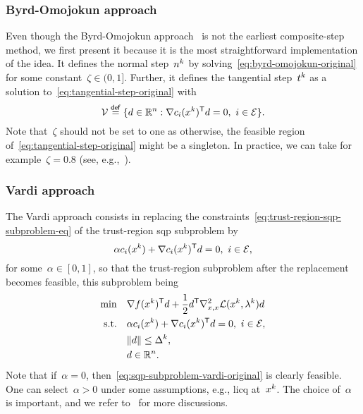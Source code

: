 \subsubsection{Byrd-Omojokun approach}

Even though the Byrd-Omojokun approach~\cite{Byrd_1987,Omojokun_1989} is not the earliest composite-step method, we first present it because it is the most straightforward implementation of the idea.
It defines the normal step~$\nstep[k]$ by solving~\cref{eq:byrd-omojokun-original} for some constant~$\zeta \in (0, 1]$.
Further, it defines the tangential step~$\tstep[k]$ as a solution to~\cref{eq:tangential-step-original} with
\begin{equation}
    \label{eq:tangential-subproblem-feasible-set}
    \mathcal{V} \eqdef \set{\step \in \R^n : \nabla \con{i}(\iter[k])^{\T} \step = 0, ~ i \in \ieq}.
\end{equation}
Note that~$\zeta$ should not be set to one as otherwise, the feasible region of~\cref{eq:tangential-step-original} might be a singleton.
In practice, we can take for example~$\zeta = 0.8$ (see, e.g.,~\cite[Eq.~(18.45)]{Nocedal_Wright_2006}).

\subsubsection{Vardi approach}

The Vardi approach consists in replacing the constraints~\cref{eq:trust-region-sqp-subproblem-eq} of the trust-region \gls{sqp} subproblem by
\begin{equation}
    \label{eq:vardi-original}
    \alpha \con{i}(\iter[k]) + \nabla \con{i}(\iter[k])^{\T} \step = 0, ~ i \in \ieq,
\end{equation}
for some~$\alpha \in [0, 1]$, so that the trust-region subproblem after the replacement becomes feasible, this subproblem being
\begin{subequations}
    \label{eq:sqp-subproblem-vardi-original}
    \begin{align}
        \min        & \quad \nabla \obj(\iter[k])^{\T} \step + \frac{1}{2} \step^{\T} \nabla_{x, x}^2 \lag(\iter[k], \lm[k]) \step\\
        \text{s.t.} & \quad \alpha \con{i}(\iter[k]) + \nabla \con{i}(\iter[k])^{\T} \step = 0, ~ i \in \ieq,\\
                    & \quad \norm{\step} \le \rad[k],\\
                    & \quad \step \in \R^n. \nonumber
    \end{align}
\end{subequations}
Note that if~$\alpha = 0$, then~\cref{eq:sqp-subproblem-vardi-original} is clearly feasible.
One can select~$\alpha > 0$ under some assumptions, e.g., \gls{licq} at~$\iter[k]$.
The choice of~$\alpha$ is important, and we refer to~\cite[\S~15.4.1]{Conn_Gould_Toint_2000} for more discussions.

